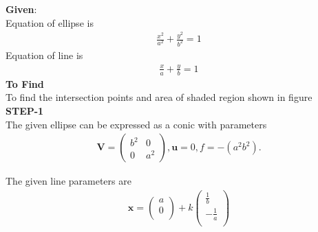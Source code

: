 \documentclass[10pt,a4paper]{report}
\newcommand{\myvec}[1]{\ensuremath{\begin{pmatrix}#1\end{pmatrix}}}
\let\vec\mathbf
\let\vec\mathbf
\begin{document}
\begin{multicols}{2}
\raggedright \textbf{Given}:\vspace{2mm}\\
Equation of ellipse is \\\vspace{1mm}
\begin{align}
\frac{x^2}{a^2}+\frac{y^2}{b^2}=1
\end{align}
Equation of line is \\ \vspace{1mm}
\begin{align}
\frac{x}{a}+\frac{y}{b}=1
\end{align}
\textbf{To Find }\vspace{2mm}\\
To find the intersection points and area of shaded region shown in figure\vspace{2mm}  \\ 
\textbf{STEP-1}\vspace{2mm}\\
\fi
The given ellipse can be expressed as a conic with parameters
\begin{align}
\vec{V}=\myvec{
b^2 & 0\\
0 & a^2
},
\vec{u}=0,
f=-(a^2b^2).
\end{align}

The given line parameters are
\iffalse
\begin{align} 
	\vec{x}=\begin{pmatrix}a \\ 0 \\ \end{pmatrix}+k\begin{pmatrix}\frac{1}{b} \\ -\frac{1}{a} \\ \end{pmatrix}
\end{align}


\end{multicols}
\end{document}
